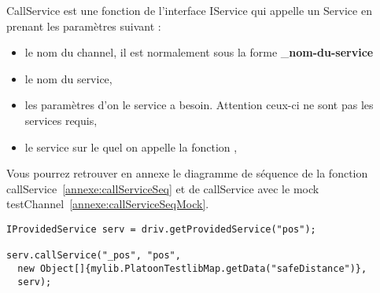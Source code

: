 CallService est une fonction de l'interface IService qui appelle un Service en prenant les paramètres suivant : 
    \begin{itemize}[label=\textbullet, font=\large]
        \item le nom du channel, il est normalement sous la forme \_{}{\bfseries nom-du-service}
        \item le nom du service,
        \item les paramètres d'on le service a besoin. Attention ceux-ci ne sont pas les services requis,
        \item le service sur le quel on appelle la fonction ,
    \end{itemize}
Vous pourrez retrouver en annexe le diagramme de séquence de la fonction callService~\ref{annexe:callServiceSeq} et de callService avec le mock testChannel~\ref{annexe:callServiceSeqMock}.

\begin{lstlisting}[frame=single, caption={Initialisation d'un LTS},label=fig:initLTS]
IProvidedService serv = driv.getProvidedService("pos");
	
serv.callService("_pos", "pos",
  new Object[]{mylib.PlatoonTestlibMap.getData("safeDistance")},
  serv);
\end{lstlisting}